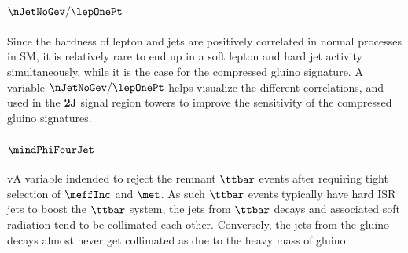 \paragraph{${\bf \nJetNoGev/\lepOnePt}$}
Since the hardness of lepton and jets are positively correlated in normal processes in SM, it is relatively rare to end up in a soft lepton and hard jet activity simultaneously, while it is the case for the compressed gluino signature. A variable $\nJetNoGev/\lepOnePt$ helps visualize the different correlations, and used in the \textbf{2J} signal region towers to improve the sensitivity of the compressed gluino signatures.


\paragraph{${\bf \mindPhiFourJet}$}
vA variable indended to reject the remnant $\ttbar$ events after requiring tight selection of $\meffInc$ and $\met$. 
As such $\ttbar$ events typically have hard ISR jets to boost the $\ttbar$ system, the jets from $\ttbar$ decays and associated soft radiation tend to be collimated each other. Conversely, the jets from the gluino decays almost never get collimated as due to the heavy mass of gluino.


